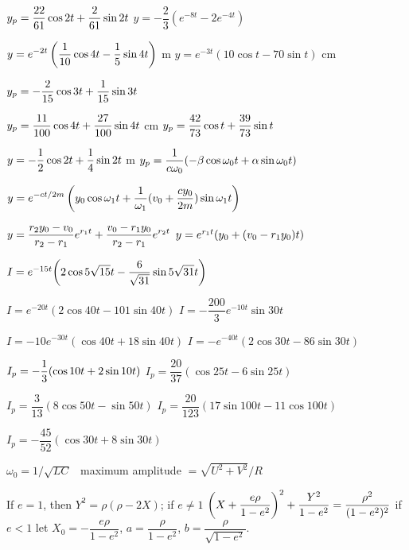  $\displaystyle{y_p=\frac{22}{61}\cos2t+\frac{2}{61}\sin2t}$ \unit{\feet}
 $y=-\dfrac{2}{3}(e^{-8t}-2e^{-4t})$

  $y=\displaystyle{e^{-2t}\left(\frac{1}{10}\cos
4t-\frac{1}{5}\sin4t\right)}$ \unit{\meter}
 $y=e^{-3t}(10\cos t-70\sin t)$ \unit{\centi\meter}

  $\displaystyle{y_p=-\frac{2}{15}\cos3t+\frac{1}{15}\sin3t}$ \unit{\feet}



  $y_p=\displaystyle{\frac{11}{100}\cos4t+\frac{27}{100}\sin4t}$ \unit{\centi\meter}
  $\displaystyle{y_p=\frac{42}{73}\cos t+\frac{39}{73}\sin t}$ \unit{\feet}


 $y=\displaystyle{-\frac{1}{2}\cos2t+\frac{1}{4}\sin2t}$ \unit{\meter}
  $\displaystyle{y_p=\frac{1}{c\omega_0}(-\beta\cos\omega_0t+
\alpha\sin\omega_0t)}$

  $y=\displaystyle{e^{-ct/2m}
\left(y_0\cos\omega_1t+\frac{1}{\omega_1}(v_0+\frac{cy_0}{2m})\sin\omega_1t\right)}$

  $y=\displaystyle{\frac{r_2y_0-v_0}{r_2-r_1}
e^{r_1t}+\frac{v_0-r_1y_0}{r_2-r_1}e^{r_2t}}$
  $y=e^{r_1t}\displaystyle{\left(y_0+(v_0-r_1y_0)t\right)}$




$I=e^{-15t}\displaystyle{\left(2\cos5\sqrt{15}t-\frac{6}{\sqrt{31}}\sin5\sqrt{31}t\right)}$

 $I=e^{-20t}(2\cos40t-101\sin40t)$
 $I=-\dfrac{200}{3}e^{-10t}\sin30t$

 $I=-10e^{-30t}(\cos40t+18\sin40t)$
 $I=-e^{-40t}(2\cos30t-86\sin30t)$

 $I_p=\displaystyle-\frac{1}{3}(\cos10t+2\sin10t)$
 $I_p=\dfrac{20}{37}(\cos25t-6\sin25t)$

 $I_p= \dfrac{3}{13}(8\cos50t-\sin50t)$
 $I_p=\dfrac{20}{123}(17\sin100t-11\cos100t)$

 $I_p=-\dfrac{45}{52}(\cos30t+8\sin30t)$

 $\omega_0=1/\sqrt{LC}$  \, maximum amplitude $=\sqrt{U^2+V^2}/R$



 If $e=1$, then
 $Y^2=\rho(\rho-2X)$;   if $e\ne1$
$\displaystyle{\left(X+\frac{e\rho}{1-e^2}\right)^2}+\dfrac{Y^2}{1-e^2}=
\dfrac{\rho^2}{(1-e^2)^2}$   if $e<1$ let
$X_0=-\dfrac{e\rho}{1-e^2}$,
$a=\dfrac{\rho}{1-e^2}$,  $b=\dfrac{\rho}{\sqrt{1-e^2}}$.

